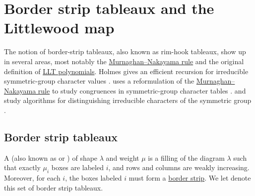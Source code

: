 
\section[borderStripTableaux]{Border strip tableaux and the Littlewood map}

The notion of border-strip tableaux, also known as rim-hook tableaux,
show up in several areas, most notably
the \hyperref[murnaghanNakayamaRule]{Murnaghan--Nakayama rule} 
and the original definition of \hyperref[LLT]{LLT polynomials}.
Holmes gives an efficient recursion for irreducible symmetric-group character
values \cite{Holmes2017x}.
 uses a reformulation of the
\hyperref[murnaghanNakayamaRule]{Murnaghan--Nakayama rule} to study
congruences in symmetric-group character tables \cite{Miller2019x}.
 and  study algorithms for
distinguishing irreducible characters of the symmetric group
\cite{ChowPaulhus2021}.


\subsection[borderStripTableauxDefinition]{Border strip tableaux}

A  (also known as  or )
of shape $\lambda$ and weight $\mu$
is a filling of the diagram $\lambda$ such that exactly $\mu_i$ boxes are labeled $i$,
and rows and columns are weakly increasing.
Moreover, for each $i$, the boxes labeled $i$ must form a \hyperref[skewShapes]{border strip}.
We let  denote this set of border strip tableaux.

